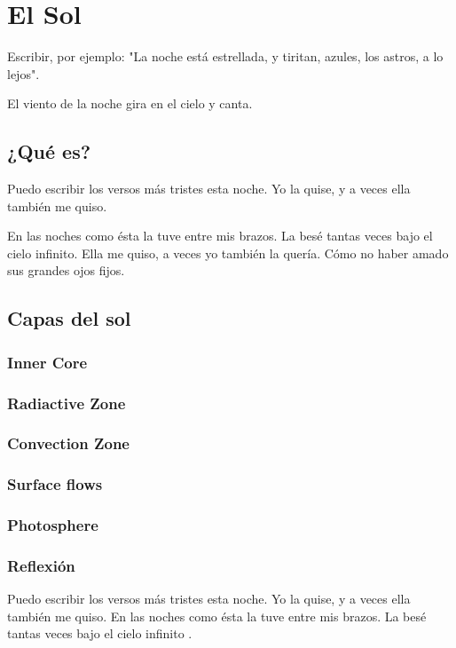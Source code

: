 \chapter{El Sol}


Escribir, por ejemplo: "La noche está estrellada, y tiritan, azules, los astros, a lo lejos".

El viento de la noche gira en el cielo y canta.

\section{¿Qué es?}

Puedo escribir los versos más tristes esta noche. Yo la quise, y a veces ella también me quiso.

En las noches como ésta la tuve entre mis brazos. La besé tantas veces bajo el cielo infinito. Ella me quiso, a veces yo también la quería. Cómo no haber amado sus grandes ojos fijos.

\section{Capas del sol}
\subsection{Inner Core}
\subsection{Radiactive Zone}
\subsection{Convection Zone}
\subsection{Surface flows}
\subsection{Photosphere}



\subsection{Reflexión}

Puedo escribir los versos más tristes \cite{lara2020} esta noche. Yo la quise, y a veces ella también me quiso. En las noches como ésta la tuve entre mis brazos. La besé tantas veces bajo el cielo infinito \citep{lara2020}.

